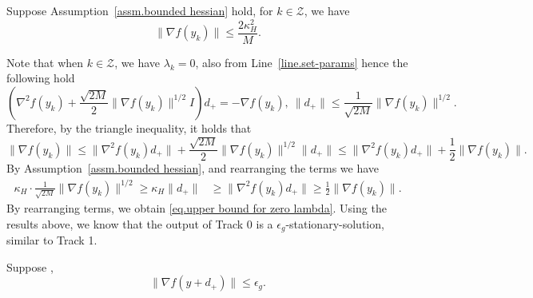 \documentclass[moor,sglanonrev]{informs4}
\begin{document}
\subsubsection{}\label{sec.oracle compl}
\begin{lemma}
    \label{lem.upper bound for zero lambda}
    Suppose Assumption~\ref{assm.bounded hessian} hold, for $k\in \mathcal{Z}$, we have
    \begin{equation}
        \label{eq.upper bound for zero lambda}
        \|\nabla f(y_k)\|\leq \frac{2\kappa_H^2}{M}.
    \end{equation}
\end{lemma}
Note that when $k\in \mathcal{Z}$, we have $\lambda_k =0$, {\color{red} also from Line~\ref{line.set-params}} hence the following hold
\begin{equation*}
    \left (\nabla^2 f(y_k)+\frac{\sqrt{2M}}{2}\|\nabla f(y_k)\|^{1/2} I\right )d_+ = -\nabla f(y_k), \ \|d_+\| \leq \frac{1}{\sqrt{2M}}\|\nabla f(y_k)\|^{1/2}.
\end{equation*}
Therefore, by the triangle inequality, it holds that
\begin{equation*}
    \|\nabla f(y_k)\| \leq \|\nabla^2 f(y_k) d_+\| +\frac{\sqrt{2M}}{2}\|\nabla f(y_k)\|^{1/2}\|d_+\| \leq \|\nabla^2 f(y_k) d_+\|+\frac{1}{2}\|\nabla f(y_k)\|.
\end{equation*}
By Assumption~\ref{assm.bounded hessian}, and rearranging the terms we have
\begin{equation*}
    \begin{aligned}
        \kappa_H \cdot \frac{1}{\sqrt{2M}}\|\nabla f(y_k)\|^{1/2}  \geq \kappa_H \|d_+\| & \geq \|\nabla^2 f(y_k) d_+\|       \geq \frac{1}{2}\|\nabla f(y_k)\|.
    \end{aligned}
\end{equation*}
By rearranging terms, we obtain \eqref{eq.upper bound for zero lambda}.
\Halmos \endproof
Using the results above, we know that the output of {Track 0} is a $\epsilon_g$-stationary-solution, similar to Track 1.
\begin{corollary}
    \label{coro.second et}
    Suppose ,
    \begin{equation*}
        \|\nabla f(y+d_+)\|\leq \epsilon_g.
    \end{equation*}
\end{corollary}
\end{document}
